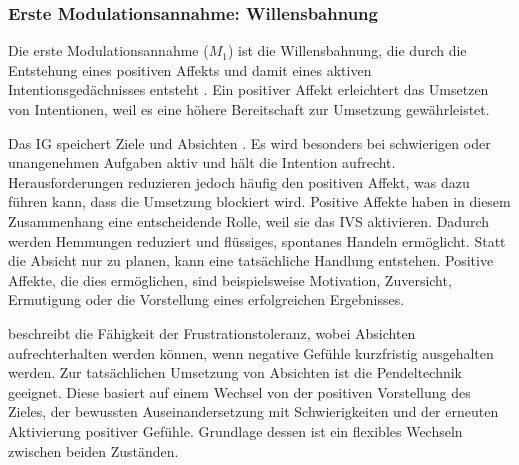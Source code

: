 \subsubsection{Erste Modulationsannahme: Willensbahnung}
Die erste Modulationsannahme ($M_1$) ist die Willensbahnung, die durch die Entstehung eines positiven Affekts und damit eines aktiven Intentionsgedächnisses entsteht \citep{Kuhl2000The}. Ein positiver Affekt erleichtert das Umsetzen von Intentionen, weil es eine höhere Bereitschaft zur Umsetzung gewährleistet. 

Das IG speichert Ziele und Absichten \citep{kuhl2005neue, kuhl2014psi}. Es wird besonders bei schwierigen oder unangenehmen Aufgaben aktiv und hält die Intention aufrecht. Herausforderungen reduzieren jedoch häufig den positiven Affekt, was dazu führen kann, dass die Umsetzung blockiert wird. Positive Affekte haben in diesem Zusammenhang eine entscheidende Rolle, weil sie das IVS aktivieren. Dadurch werden Hemmungen reduziert und flüssiges, spontanes Handeln ermöglicht. Statt die Absicht nur zu planen, kann eine tatsächliche Handlung entstehen. Positive Affekte, die dies ermöglichen, sind beispielsweise Motivation, Zuversicht, Ermutigung oder die Vorstellung eines erfolgreichen Ergebnisses.

\cite{kuhl2005neue} beschreibt die Fähigkeit der Frustrationstoleranz, wobei Absichten aufrechterhalten werden können, wenn negative Gefühle kurzfristig ausgehalten werden. Zur tatsächlichen Umsetzung von Absichten ist die Pendeltechnik geeignet. Diese basiert auf einem Wechsel von der positiven Vorstellung des Zieles, der bewussten Auseinandersetzung mit Schwierigkeiten und der erneuten Aktivierung positiver Gefühle. Grundlage dessen ist ein flexibles Wechseln zwischen beiden Zuständen.



